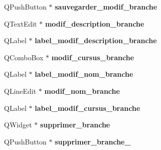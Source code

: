 \begin{DoxyCompactItemize}
\item 
\hypertarget{class_ui___administration_a3c0155210e79af344dfd2e4c446e3c54}{Q\+Push\+Button $\ast$ {\bfseries sauvegarder\+\_\+modif\+\_\+branche}}\label{class_ui___administration_a3c0155210e79af344dfd2e4c446e3c54}

\item 
\hypertarget{class_ui___administration_a60cfa23b3f28e8229c9783a54ff2697c}{Q\+Text\+Edit $\ast$ {\bfseries modif\+\_\+description\+\_\+branche}}\label{class_ui___administration_a60cfa23b3f28e8229c9783a54ff2697c}

\item 
\hypertarget{class_ui___administration_a12d616e285519c4ee56399fb7204f479}{Q\+Label $\ast$ {\bfseries label\+\_\+modif\+\_\+description\+\_\+branche}}\label{class_ui___administration_a12d616e285519c4ee56399fb7204f479}

\item 
\hypertarget{class_ui___administration_a8ffb9495d6f5f3c1b14a4fa95ced3519}{Q\+Combo\+Box $\ast$ {\bfseries modif\+\_\+cursus\+\_\+branche}}\label{class_ui___administration_a8ffb9495d6f5f3c1b14a4fa95ced3519}

\item 
\hypertarget{class_ui___administration_a679b46109239b183b8f11fa3fb1f2acd}{Q\+Label $\ast$ {\bfseries label\+\_\+modif\+\_\+nom\+\_\+branche}}\label{class_ui___administration_a679b46109239b183b8f11fa3fb1f2acd}

\item 
\hypertarget{class_ui___administration_a58d15e9b9c5618b962a785334d17e2f9}{Q\+Line\+Edit $\ast$ {\bfseries modif\+\_\+nom\+\_\+branche}}\label{class_ui___administration_a58d15e9b9c5618b962a785334d17e2f9}

\item 
\hypertarget{class_ui___administration_ab95520b7fa2b255cb3b27bcce069b6cb}{Q\+Label $\ast$ {\bfseries label\+\_\+modif\+\_\+cursus\+\_\+branche}}\label{class_ui___administration_ab95520b7fa2b255cb3b27bcce069b6cb}

\item 
\hypertarget{class_ui___administration_a8dba9951c1fc6cb23ff60f6815f6e887}{Q\+Widget $\ast$ {\bfseries supprimer\+\_\+branche}}\label{class_ui___administration_a8dba9951c1fc6cb23ff60f6815f6e887}

\item 
\hypertarget{class_ui___administration_a71cc4a9eb67b6671798110399de5799e}{Q\+Push\+Button $\ast$ {\bfseries supprimer\+\_\+branche\+\_}}\label{class_ui___administration_a71cc4a9eb67b6671798110399de5799e}


\end{DoxyCompactItemize}
